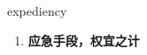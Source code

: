 
\begin{frame}
{\huge expediency}
\begin{center}
\begin{enumerate}\Large
  \item \textbf{应急手段，权宜之计}
\end{enumerate}
\end{center}
\end{frame}
